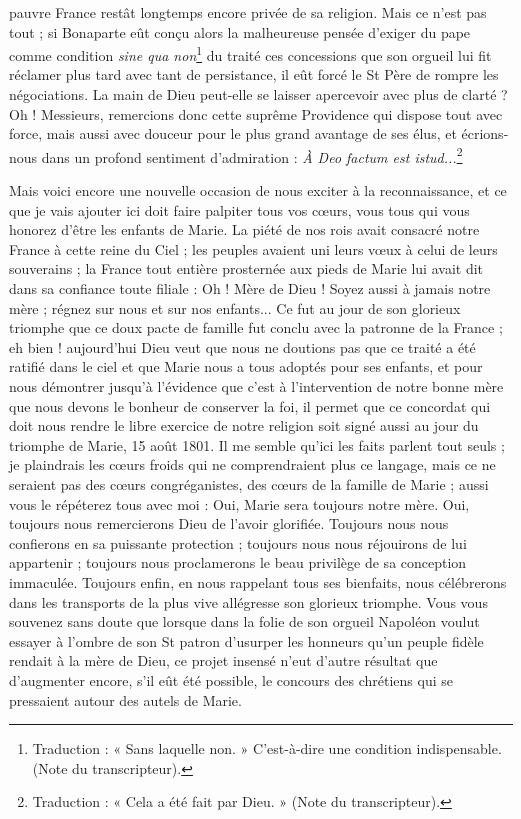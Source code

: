 pauvre France restât longtemps encore privée de sa religion. Mais ce n'est pas tout ; si Bonaparte eût conçu alors la malheureuse pensée d'exiger du pape comme condition \textit{sine qua non}\footnote{Traduction : « Sans laquelle non. » C’est-à-dire une condition indispensable. (Note du transcripteur).} du traité ces concessions que son orgueil lui fit réclamer plus tard avec tant de persistance, il eût forcé le St Père de rompre les négociations. La main de Dieu peut-elle se laisser apercevoir avec plus de clarté ? Oh ! Messieurs, remercions donc cette suprême Providence qui dispose tout avec force, mais aussi avec douceur pour le plus grand avantage de ses élus, et écrions-nous dans un profond sentiment d'admiration : \textit{À Deo factum est istud...}\footnote{Traduction : « Cela a été fait par Dieu. » (Note du transcripteur).}

Mais voici encore une nouvelle occasion de nous exciter à la reconnaissance, et ce que je vais ajouter ici doit faire palpiter tous vos cœurs, vous tous qui vous honorez d'être les enfants de Marie. La piété de nos rois avait consacré notre France à cette reine du Ciel ; les peuples avaient uni leurs vœux à celui de leurs souverains ; la France tout entière prosternée aux pieds de Marie lui avait dit dans sa confiance toute filiale : Oh ! Mère de Dieu ! Soyez aussi à jamais notre mère ; régnez sur nous et sur nos enfants... Ce fut au jour de son glorieux triomphe que ce doux pacte de famille fut conclu avec la patronne de la France ; eh bien ! aujourd'hui Dieu veut que nous ne doutions pas que ce traité a été ratifié dans le ciel et que Marie nous a tous adoptés pour ses enfants, et pour nous démontrer jusqu'à l'évidence que c'est à l'intervention de notre bonne mère que nous devons le bonheur de conserver la foi, il permet que ce concordat
qui doit nous rendre le libre exercice de notre religion soit signé aussi au jour du triomphe de Marie, 15 août 1801. Il me semble qu'ici les faits parlent tout seuls ; je plaindrais les cœurs froids qui ne comprendraient plus ce langage, mais ce ne seraient pas des cœurs congréganistes, des cœurs de la famille de Marie ; aussi vous le répéterez tous avec moi : Oui, Marie sera toujours notre mère. Oui, toujours nous remercierons Dieu de l'avoir glorifiée. Toujours nous nous confierons en sa puissante protection ; toujours nous nous réjouirons de lui appartenir ; toujours nous proclamerons le beau privilège de sa conception immaculée. Toujours enfin, en nous rappelant tous ses bienfaits, nous célébrerons dans les transports de la plus vive allégresse son glorieux triomphe. Vous vous souvenez sans doute que lorsque dans la folie de son orgueil Napoléon voulut essayer à l'ombre de son St patron d'usurper les honneurs qu'un peuple fidèle rendait à la mère de Dieu, ce projet insensé n'eut d'autre résultat que d'augmenter encore, s'il eût été possible, le concours des chrétiens qui se pressaient autour des autels de Marie.

